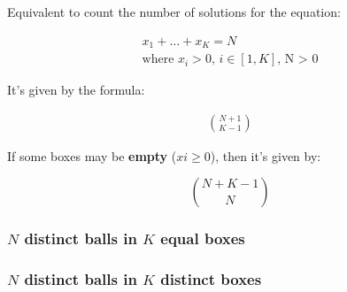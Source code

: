 Equivalent to count the number of solutions for the equation: 

\begin{equation}
    \begin{array}{c}
        x_1 + \ldots + x_K = N \\
        \text{where $x_i > 0$,  $i \in \left[1,K\right]$, N > 0}
    \end{array}
\end{equation}

It's given by the formula:

\begin{equation}
    \begin{array}{c}
        \binom{N+1}{K-1}
    \end{array}
\end{equation}

If some boxes may be \textbf{empty} ($xi \geq 0$), then it's given by:

$$
    \binom{N + K - 1}{N}
$$

\subsubsection{$N$ distinct balls in $K$ equal boxes}

\subsubsection{$N$ distinct balls in $K$ distinct boxes}

